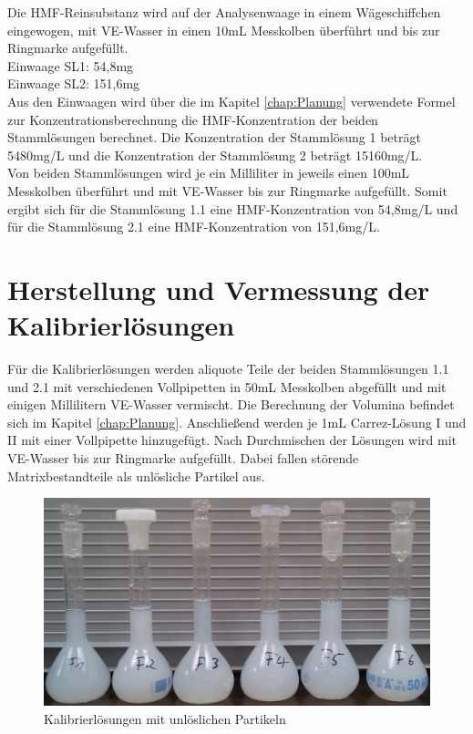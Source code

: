 Die HMF-Reinsubstanz wird auf der Analysenwaage in einem Wägeschiffchen eingewogen, mit VE-Wasser in einen 10mL Messkolben überführt und bis zur Ringmarke aufgefüllt.\\
Einwaage SL1: 54,8mg\\
Einwaage SL2: 151,6mg\\
Aus den Einwaagen wird über die im Kapitel \ref{chap:Planung} verwendete Formel zur Konzentrationsberechnung die HMF-Konzentration der beiden Stammlösungen berechnet. Die Konzentration der Stammlösung 1 beträgt 5480mg/L und die Konzentration der Stammlösung 2 beträgt 15160mg/L.\\ 
Von beiden Stammlösungen wird je ein Milliliter in jeweils einen 100mL Messkolben überführt und mit VE-Wasser bis zur Ringmarke aufgefüllt. Somit ergibt sich für die Stammlösung 1.1 eine HMF-Konzentration von 54,8mg/L und für die Stammlösung 2.1 eine HMF-Konzentration von 151,6mg/L. 

    \section{Herstellung und Vermessung der Kalibrierlösungen}

    Für die Kalibrierlösungen werden aliquote Teile der beiden Stammlösungen 1.1 und 2.1 mit verschiedenen Vollpipetten in 50mL Messkolben abgefüllt und mit einigen Millilitern VE-Wasser vermischt. Die Berechnung der Volumina befindet sich im Kapitel \ref{chap:Planung}. Anschließend werden je 1mL Carrez-Lösung I und II mit einer Vollpipette hinzugefügt. Nach Durchmischen der Lösungen wird mit VE-Wasser bis zur Ringmarke aufgefüllt. Dabei fallen störende Matrixbestandteile als unlösliche Partikel aus.
    
    \begin{figure}[htbp]
      \centering
      \includegraphics[width=1.00\textwidth]{../Bilder/20150424_155955.jpg}
      \caption{Kalibrierlösungen mit unlöslichen Partikeln}
      \label{fig:Partikel}
    \end{figure}
    
